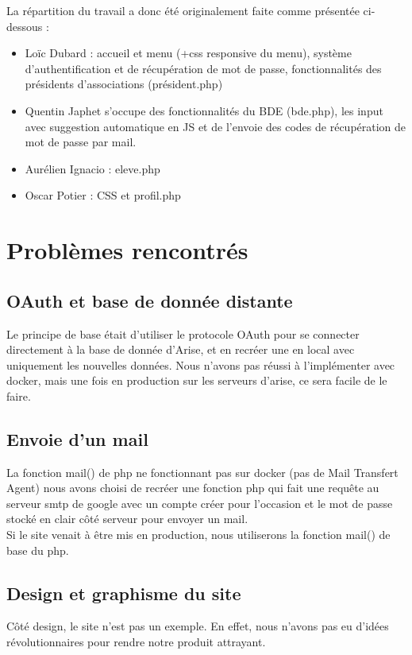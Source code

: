 \documentclass[french]{article}
\begin{document}
La répartition du travail a donc été originalement faite comme présentée ci-dessous : \\

\begin{itemize}
	\item Loïc Dubard : accueil et menu (+css responsive du menu), système d'authentification et de récupération de mot de passe, fonctionnalités des présidents d'associations (président.php)\\ 
	\item Quentin Japhet s'occupe des fonctionnalités du BDE (bde.php), les input avec suggestion automatique en JS et de l'envoie des codes de récupération de mot de passe par mail. \\
	\item Aurélien Ignacio : eleve.php\\
	\item Oscar Potier : CSS et profil.php\\
\end{itemize}

\section{Problèmes rencontrés}
\subsection{OAuth et base de donnée distante}
Le principe de base était d'utiliser le protocole OAuth pour se connecter directement à la base de donnée d'Arise, et en recréer une en local avec uniquement les nouvelles données. Nous n'avons pas réussi à l'implémenter avec docker, mais une fois en production sur les serveurs d'arise, ce sera facile de le faire.  

\subsection{Envoie d'un mail}
La fonction mail() de php ne fonctionnant pas sur docker (pas de Mail Transfert Agent) nous avons choisi de recréer une fonction php qui fait une requête au serveur smtp de google avec un compte créer pour l'occasion et le mot de passe stocké en clair côté serveur pour envoyer un mail.\\

Si le site venait à être mis en production, nous utiliserons la fonction mail() de base du php.\\

\subsection{Design et graphisme du site}
Côté design, le site n'est pas un exemple. En effet, nous n'avons pas eu d'idées révolutionnaires pour rendre notre produit attrayant.
\end{document}
